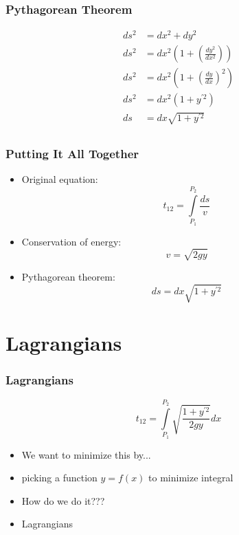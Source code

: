 \documentclass[12pt]{beamer}
\begin{document}
\begin{frame}
\frametitle{Pythagorean Theorem}
\begin{align*}
    ds^2 &= dx^2 + dy^2 \\
    ds^2 &= dx^2 \left ( 1 + \left ( \frac{dy^2}{dx^2} \right) \right) \\
    ds^2 &= dx^2 \left ( 1 + \left ( \frac{dy}{dx} \right)^2 \right) \\
    ds^2 &= dx^2 \left ( 1 + y^{'2} \right ) \\
    ds &= dx \sqrt{1 + y^{'2}} \\
\end{align*}
\end{frame}

\begin{frame}
\frametitle{Putting It All Together}
\begin{itemize}
    \item Original equation:
    $$
    t_{12} = \int \limits_{P_1}^{P_2} \frac{ds}{v}
    $$
    \pause
    \item Conservation of energy:
    $$
    v = \sqrt{2gy}
    $$
    \pause
    \item Pythagorean theorem:
    $$
    ds = dx \sqrt{1 + y^{'2}}
    $$
\end{itemize}
\end{frame}

\section{Lagrangians}
\begin{frame}
\frametitle{Lagrangians}
    $$
    t_{12} = \int \limits_{P_1}^{P_2} \sqrt{\frac{1 + y^{'2}}{2gy}} dx
    $$
\pause
\begin{itemize}
    \item We want to minimize this by...
    \pause
    \item picking a function $y = f(x)$ to minimize integral
    \pause
    \item How do we do it???
    \pause
    \item Lagrangians
\end{itemize}
\end{frame}
\end{document}

